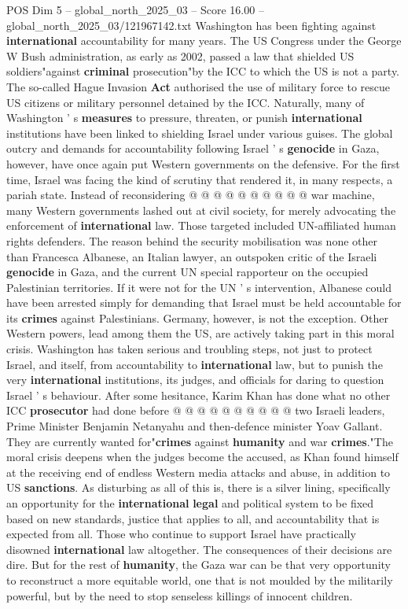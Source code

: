 \begin{textsample}{POS Dim 5 – global\_north\_2025\_03 – Score 16.00 – global\_north\_2025\_03/121967142.txt}
Washington has been fighting against \textbf{international} accountability for many years.
The US Congress under the George W Bush administration, as early as 2002, passed a law that shielded US soldiers"against \textbf{criminal} prosecution"by the ICC to which the US is not a party.
The so-called Hague Invasion \textbf{Act} authorised the use of military force to rescue US citizens or military personnel detained by the ICC.
Naturally, many of Washington ' s \textbf{measures} to pressure, threaten, or punish \textbf{international} institutions have been linked to shielding Israel under various guises.
The global outcry and demands for accountability following Israel ' s \textbf{genocide} in Gaza, however, have once again put Western governments on the defensive.
For the first time, Israel was facing the kind of scrutiny that rendered it, in many respects, a pariah state.
Instead of reconsidering @ @ @ @ @ @ @ @ @ @ war machine, many Western governments lashed out at civil society, for merely advocating the enforcement of \textbf{international} law.
Those targeted included UN-affiliated human rights defenders.
The reason behind the security mobilisation was none other than Francesca Albanese, an Italian lawyer, an outspoken critic of the Israeli \textbf{genocide} in Gaza, and the current UN special rapporteur on the occupied Palestinian territories.
If it were not for the UN ' s intervention, Albanese could have been arrested simply for demanding that Israel must be held accountable for its \textbf{crimes} against Palestinians.
Germany, however, is not the exception.
Other Western powers, lead among them the US, are actively taking part in this moral crisis.
Washington has taken serious and troubling steps, not just to protect Israel, and itself, from accountability to \textbf{international} law, but to punish the very \textbf{international} institutions, its judges, and officials for daring to question Israel ' s behaviour.
After some hesitance, Karim Khan has done what no other ICC \textbf{prosecutor} had done before @ @ @ @ @ @ @ @ @ @ two Israeli leaders, Prime Minister Benjamin Netanyahu and then-defence minister Yoav Gallant.
They are currently wanted for"\textbf{crimes} against \textbf{humanity} and war \textbf{crimes}."The moral crisis deepens when the judges become the accused, as Khan found himself at the receiving end of endless Western media attacks and abuse, in addition to US \textbf{sanctions}.
As disturbing as all of this is, there is a silver lining, specifically an opportunity for the \textbf{international} \textbf{legal} and political system to be fixed based on new standards, justice that applies to all, and accountability that is expected from all.
Those who continue to support Israel have practically disowned \textbf{international} law altogether.
The consequences of their decisions are dire.
But for the rest of \textbf{humanity}, the Gaza war can be that very opportunity to reconstruct a more equitable world, one that is not moulded by the militarily powerful, but by the need to stop senseless killings of innocent children.


\end{textsample}
